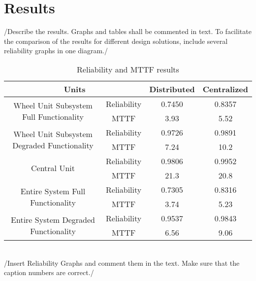 \newpage
\section{Results}
/{Describe the results. Graphs and tables shall be commented in text. To facilitate the comparison of the results for different design solutions, include several reliability graphs in one diagram.}/
\begin{table}[h]
\centering
\begin{tabular}{| c | c | c | c |}
\hline
\multicolumn{2}{|c|}{Units} & Distributed & Centralized\\
\hline
\multirow{2}{*}{Wheel Unit Subsystem Full Functionality} & Reliability & 0.7450 & 0.8357\\
 & MTTF & 3.93  & 5.52\\
\hline
\multirow{2}{*}{Wheel Unit Subsystem Degraded Functionality}& Reliability & 0.9726  & 0.9891\\
 & MTTF & 7.24 & 10.2\\
\hline
\multirow{2}{*}{Central Unit}& Reliability& 0.9806  & 0.9952\\
 & MTTF & 21.3  & 20.8\\
\hline
\multirow{2}{*}{Entire System Full Functionality}& Reliability & 0.7305  & 0.8316\\
 & MTTF & 3.74 & 5.23\\
\hline
\multirow{2}{*}{Entire System Degraded Functionality}& Reliability & 0.9537 & 0.9843\\
 & MTTF & 6.56 & 9.06\\
\hline
\end{tabular}
\caption{Reliability and MTTF results}
\label{tab:Put a Lable}
\end{table}
\\/{Insert Reliability Graphs and comment them in the text. Make sure that the caption numbers are correct.}/